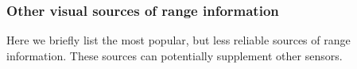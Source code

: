 \documentclass[twocolumn,oneside]{book}
\begin{document}
\subsubsection{Other visual sources of range information}

Here we briefly list the most popular, but less reliable sources of range
information. These sources can potentially supplement other sensors.
\begin{itemize}








\end{itemize}
\end{document}
